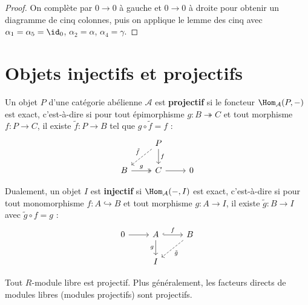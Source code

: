 \begin{proof}
On complète par $0 \to 0$ à gauche et $0 \to 0$ à droite pour obtenir
un diagramme de cinq colonnes, puis on applique le lemme des cinq avec
$\alpha_1 = \alpha_5 = \id_0$, $\alpha_2 = \alpha$, $\alpha_4 = \gamma$.
\end{proof}


\section{Objets injectifs et projectifs}\label{sec:injective-projective}

\begin{definition}\label{def:projective-object}
Un objet $P$ d'une catégorie abélienne $\mathcal{A}$ est \textbf{projectif}
si le foncteur $\Hom_{\mathcal{A}}(P, -)$ est exact, c'est-à-dire si
pour tout épimorphisme $g \colon B \twoheadrightarrow C$ et tout morphisme
$f \colon P \to C$, il existe $\tilde{f} \colon P \to B$ tel que
$g \circ \tilde{f} = f$ :
\[
\begin{tikzcd}
& P \arrow[d, "f"] \arrow[dl, dashed, "\tilde{f}"'] \\
B \arrow[r, two heads, "g"] & C \arrow[r] & 0
\end{tikzcd}
\]
\end{definition}

\begin{definition}\label{def:injective-object}
Dualement, un objet $I$ est \textbf{injectif} si $\Hom_{\mathcal{A}}(-, I)$
est exact, c'est-à-dire si pour tout monomorphisme $f \colon A \hookrightarrow B$
et tout morphisme $g \colon A \to I$, il existe $\tilde{g} \colon B \to I$
avec $\tilde{g} \circ f = g$ :
\[
\begin{tikzcd}
0 \arrow[r] & A \arrow[r, hook, "f"] \arrow[d, "g"'] & B \arrow[dl, dashed, "\tilde{g}"] \\
& I &
\end{tikzcd}
\]
\end{definition}

\begin{proposition}\label{prop:free-projective}
Tout $R$-module libre est projectif. Plus généralement, les
facteurs directs de modules libres (modules projectifs) sont projectifs.
\end{proposition}

